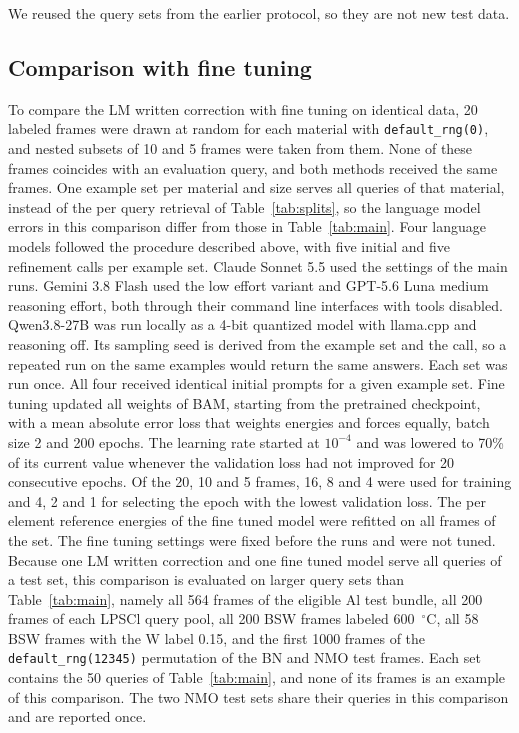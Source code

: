 \ifbulk We reused the query sets from the earlier protocol, so they are not new test data.\fi{} 

\ifbulk
\subsection{Comparison with fine tuning}

To compare the LM written correction with fine tuning on identical data, 20 labeled frames were drawn at random for each material with \texttt{default\_rng(0)}, and nested subsets of 10 and 5 frames were taken from them. None of these frames coincides with an evaluation query, and both methods received the same frames. One example set per material and size serves all queries of that material, instead of the per query retrieval of Table~\ref{tab:splits}, so the language model errors in this comparison differ from those in Table~\ref{tab:main}. Four language models followed the procedure described above, with five initial and five refinement calls per example set. Claude Sonnet 5.5 used the settings of the main runs. Gemini 3.8 Flash\cite{google2026gemini38flash} used the low effort variant and GPT-5.6 Luna medium reasoning effort, both through their command line interfaces with tools disabled. Qwen3.8-27B\cite{qwen38} was run locally as a 4-bit quantized model with llama.cpp\cite{llamacpp} and reasoning off. Its sampling seed is derived from the example set and the call, so a repeated run on the same examples would return the same answers. Each set was run once. All four received identical initial prompts for a given example set. Fine tuning updated all weights of BAM, starting from the pretrained checkpoint, with a mean absolute error loss that weights energies and forces equally, batch size 2 and 200 epochs. The learning rate started at $10^{-4}$ and was lowered to 70\% of its current value whenever the validation loss had not improved for 20 consecutive epochs. Of the 20, 10 and 5 frames, 16, 8 and 4 were used for training and 4, 2 and 1 for selecting the epoch with the lowest validation loss. The per element reference energies of the fine tuned model were refitted on all frames of the set. The fine tuning settings were fixed before the runs and were not tuned. Because one LM written correction and one fine tuned model serve all queries of a test set, this comparison is evaluated on larger query sets than Table~\ref{tab:main}, namely all 564 frames of the eligible Al test bundle, all 200 frames of each LPSCl query pool, all 200 BSW frames labeled 600~$^{\circ}$C, all 58 BSW frames with the W label 0.15, and the first 1000 frames of the \texttt{default\_rng(12345)} permutation of the BN and NMO test frames. Each set contains the 50 queries of Table~\ref{tab:main}, and none of its frames is an example of this comparison. The two NMO test sets share their queries in this comparison and are reported once.

